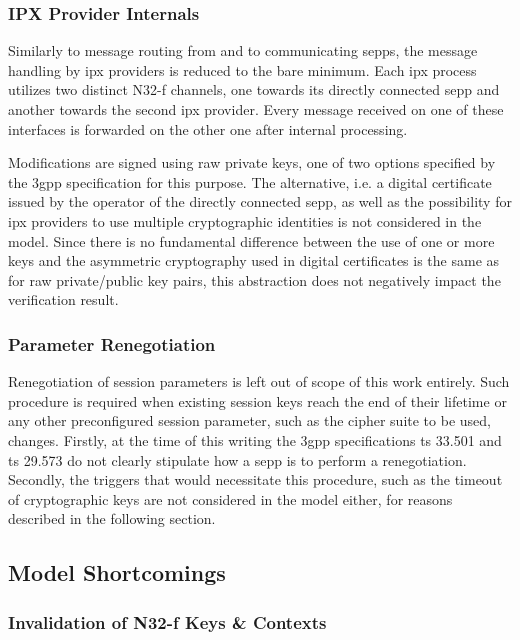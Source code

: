 \subsubsection{IPX Provider Internals}

Similarly to message routing from and to communicating \glspl{sepp}, the message handling by \gls{ipx} providers is reduced to the bare minimum.
Each \gls{ipx} process utilizes two distinct N32-f channels, one towards its directly connected \gls{sepp} and another towards the second \gls{ipx} provider.
Every message received on one of these interfaces is forwarded on the other one after internal processing.

Modifications are signed using raw private keys, one of two options specified by the \gls{3gpp} specification for this purpose.
The alternative, i.e. a digital certificate issued by the operator of the directly connected \gls{sepp}, as well as the possibility for \gls{ipx} providers to use multiple cryptographic identities is not considered in the model.
Since there is no fundamental difference between the use of one or more keys and the asymmetric cryptography used in digital certificates is the same as for raw private/public key pairs, this abstraction does not negatively impact the verification result.

\subsubsection{Parameter Renegotiation}

Renegotiation of session parameters is left out of scope of this work entirely.
Such procedure is required when existing session keys reach the end of their lifetime or any other preconfigured session parameter, such as the cipher suite to be used, changes.
Firstly, at the time of this writing the \gls{3gpp} specifications \gls{ts} 33.501 and \gls{ts} 29.573 do not clearly stipulate how a \gls{sepp} is to perform a renegotiation.
Secondly, the triggers that would necessitate this procedure, such as the timeout of cryptographic keys are not considered in the model either, for reasons described in the following section.

\subsection{Model Shortcomings}

\subsubsection{Invalidation of N32-f Keys \& Contexts}

